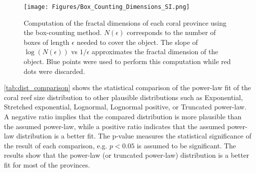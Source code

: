 \begin{figure}[H]
    \centering
    \texttt{[image: Figures/Box\_Counting\_Dimensions\_SI.png]}
    \caption{Computation of the fractal dimensions of each coral province
        using the box-counting method. $N(\epsilon)$ corresponds to the number
        of boxes
        of length $\epsilon$ needed to cover the object. The slope of
        $\log(N(\epsilon))$ vs $1/\epsilon$ approximates the fractal dimension
        of the
        object. Blue points were used to perform this computation while red
        dots were
        discarded.}
    \label{fig:Box_Counting_SI}
\end{figure}

\cref{tab:dist_comparison} shows the statistical comparison of the power-law
fit of the coral reef size distribution to other plausible distributions such
as Exponential, Stretched exponential, Lognormal, Lognormal positive, or
Truncated power-law. A negative ratio implies that the compared distribution is
more plausible than the assumed power-law, while a positive ratio indicates
that the assumed power-law distribution is a better fit. The p-value measures
the statistical significance of the result of each comparison, e.g. $p<0.05$
is assumed to be significant. The results show that the power-law (or truncated
power-law) distribution is a better fit for most of the provinces.

